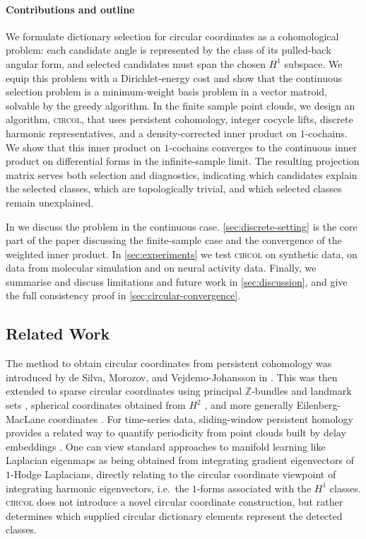 \documentclass[a4paper,11pt, DIV=10]{scrartcl}
\numberwithin{equation}{section}
\theoremstyle{definition}
\theoremstyle{remark}
\newcommand{\Z}{\mathbb{Z}}
\begin{document}
\paragraph{Contributions and outline}
We formulate dictionary selection for circular coordinates as a cohomological problem: each candidate angle is represented by the class of its pulled-back angular form, and selected candidates must span the chosen $H^1$ subspace.
We equip this problem with a Dirichlet-energy cost and show that the continuous selection problem is a minimum-weight basis problem in a vector matroid, solvable by the greedy algorithm.
In the finite sample point clouds, we design an algorithm, \textsc{circol}, that uses persistent cohomology, integer cocycle lifts, discrete harmonic representatives, and a density-corrected inner product on $1$-cochains.
We show that this inner product on $1$-cochains converges to the continuous inner product on differential forms in the infinite-sample limit.
The resulting projection matrix serves both selection and diagnostics, indicating which candidates explain the selected classes, which are topologically trivial, and which selected classes remain unexplained.

In  we discuss the problem in the continuous case.
\cref{sec:discrete-setting} is the core part of the paper discussing the finite-sample case and the convergence of the weighted inner product.
In \cref{sec:experiments} we test \textsc{circol} on synthetic data, on data from molecular simulation and on neural activity data.
Finally, we summarise and discuss limitations and future work in \cref{sec:discussion}, and give the full consistency proof in \cref{sec:circular-convergence}.

\subsection{Related Work}
The method to obtain circular coordinates from persistent cohomology was introduced by de Silva, Morozov, and Vejdemo-Johansson in \cite{DeSilva2009persistent}.
This was then extended to sparse circular coordinates using principal $\Z$-bundles and landmark sets \cite{Perea2020}, spherical coordinates obtained from $H^2$ \cite{schonsheck2024spherical}, and more generally Eilenberg-MacLane coordinates \cite{perea2017multiscaleProjective}.
For time-series data, sliding-window persistent homology provides a related way to quantify periodicity from point clouds built by delay embeddings \cite{perea2015sliding}.
One can view standard approaches to manifold learning like Laplacian eigenmaps \cite{belkin2003laplacian,coifman2006diffusion} as being obtained from integrating gradient eigenvectors of $1$-Hodge Laplacians, directly relating to the circular coordinate viewpoint of integrating harmonic eigenvectors, i.e.\ the $1$-forms associated with the $H^1$ classes.
\textsc{circol} does not introduce a novel circular coordinate construction, but rather determines which supplied circular dictionary elements represent the detected classes.
\end{document}
